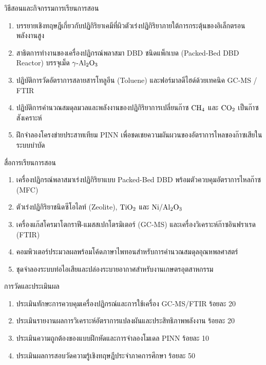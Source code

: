 \newpage

\begin{planbox}{วิธีสอนและกิจกรรมการเรียนการสอน}
\begin{enumerate}
    \item บรรยายเชิงทฤษฎีเกี่ยวกับปฏิกิริยาเคมีที่ผิวตัวเร่งปฏิกิริยาภายใต้การกระตุ้นของอิเล็กตรอนพลังงานสูง
    \item สาธิตการทำงานของเครื่องปฏิกรณ์พลาสมา DBD ชนิดแพ็กเบด (Packed-Bed DBD Reactor) บรรจุเม็ด $\ce{\gamma-Al2O3}$
    \item ปฏิบัติการวัดอัตราการสลายสารโทลูอีน (Toluene) และฟอร์มาลดีไฮด์ด้วยเทคนิค GC-MS / FTIR
    \item ปฏิบัติการคำนวณสมดุลมวลและพลังงานของปฏิกิริยาการเปลี่ยนก๊าซ $\ce{CH4}$ และ $\ce{CO2}$ เป็นก๊าซสังเคราะห์
    \item ฝึกจำลองโครงข่ายประสาทเทียม PINN เพื่อชดเชยความผันผวนของอัตราการไหลของก๊าซเสียในระบบบำบัด
\end{enumerate}
\end{planbox}

\begin{planbox}{สื่อการเรียนการสอน}
\begin{enumerate}
    \item เครื่องปฏิกรณ์พลาสมาเร่งปฏิกิริยาแบบ Packed-Bed DBD พร้อมตัวควบคุมอัตราการไหลก๊าซ (MFC)
    \item ตัวเร่งปฏิกิริยาชนิดซีโอไลท์ (Zeolite), $\ce{TiO2}$ และ $\ce{Ni/Al2O3}$
    \item เครื่องแก๊สโครมาโตกราฟี-แมสสเปกโตรมิเตอร์ (GC-MS) และเครื่องวิเคราะห์ก๊าซอินฟราเรด (FTIR)
    \item คอมพิวเตอร์ประมวลผลพร้อมโค้ดภาษาไพทอนสำหรับการคำนวณสมดุลอุณหพลศาสตร์
    \item ชุดจำลองระบบท่อไอเสียและปล่องระบายอากาศสำหรับงานเกษตรอุตสาหกรรม
\end{enumerate}
\end{planbox}

\begin{planbox}{การวัดและประเมินผล}
\begin{enumerate}
    \item ประเมินทักษะการควบคุมเครื่องปฏิกรณ์และการใช้เครื่อง GC-MS/FTIR ร้อยละ 20
    \item ประเมินรายงานผลการวิเคราะห์อัตราการแปลงผันและประสิทธิภาพพลังงาน ร้อยละ 20
    \item ประเมินความถูกต้องของแบบฝึกหัดและการจำลองโมเดล PINN ร้อยละ 10
    \item ประเมินผลการสอบวัดความรู้เชิงทฤษฎีประจำภาคการศึกษา ร้อยละ 50
\end{enumerate}
\end{planbox}

